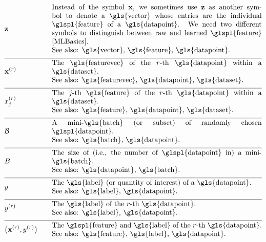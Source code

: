 \begin{align}
	&\rawfeaturevec &\quad &\parbox{.85\textwidth}{Instead of the symbol $\featurevec$, we 
		sometimes use $\rawfeaturevec$ as another symbol to denote a \gls{vector} whose entries 
		are the individual \glspl{feature} of a \gls{datapoint}. We need two 
		different symbols to distinguish between raw and learned \glspl{feature} \cite[Ch. 9]{MLBasics}.
		\\ See also: \gls{vector}, \gls{feature}, \gls{datapoint}. }\nonumber \\[2mm] \hline \nonumber\\[-5mm]
	&\featurevec^{(\sampleidx)} &\quad &\parbox{.85\textwidth}{The \gls{featurevec} of the $\sampleidx$-th \gls{datapoint} within a \gls{dataset}.
		\\ See also: \gls{featurevec}, \gls{datapoint}, \gls{dataset}. } \nonumber \\[2mm] \hline \nonumber\\[-5mm]
	&\feature_{\featureidx}^{(\sampleidx)} &\quad &\parbox{.85\textwidth}{The $\featureidx$-th \gls{feature} of the $\sampleidx$-th 
		\gls{datapoint} within a \gls{dataset}.
		\\ See also: \gls{feature}, \gls{datapoint}, \gls{dataset}.} \nonumber \\[2mm] \hline \nonumber\\[-5mm]
	&\batch &\quad &\parbox{.85\textwidth}{A mini-\gls{batch} (or subset) of randomly chosen \glspl{datapoint}.
		\\ See also: \gls{batch}, \gls{datapoint}. }\nonumber \\[2mm] \hline \nonumber\\[-5mm]
	&\batchsize &\quad &\parbox{.85\textwidth}{The size of (i.e., the number of \glspl{datapoint} in) a mini-\gls{batch}.
		\\ See also: \gls{datapoint}, \gls{batch}. }\nonumber \\[2mm] \hline \nonumber\\[-5mm]
	&\truelabel &\quad &\parbox{.85\textwidth}{The \gls{label} (or quantity of interest) of a \gls{datapoint}.
		\\ See also: \gls{label}, \gls{datapoint}. } \nonumber \\[2mm] \hline \nonumber\\[-5mm]
	&\truelabel^{(\sampleidx)} &\quad &\parbox{.85\textwidth}{The \gls{label} of the $\sampleidx$-th \gls{datapoint}.
		\\ See also: \gls{label}, \gls{datapoint}. } \nonumber \\[2mm] \hline \nonumber\\[-5mm]
	&\big(\featurevec^{(\sampleidx)},\truelabel^{(\sampleidx)}\big) &\quad &\parbox{.85\textwidth}{The \glspl{feature} and \gls{label} of the $\sampleidx$-th \gls{datapoint}.
		\\ See also: \gls{feature}, \gls{label}, \gls{datapoint}. }\nonumber 
\end{align}                  


